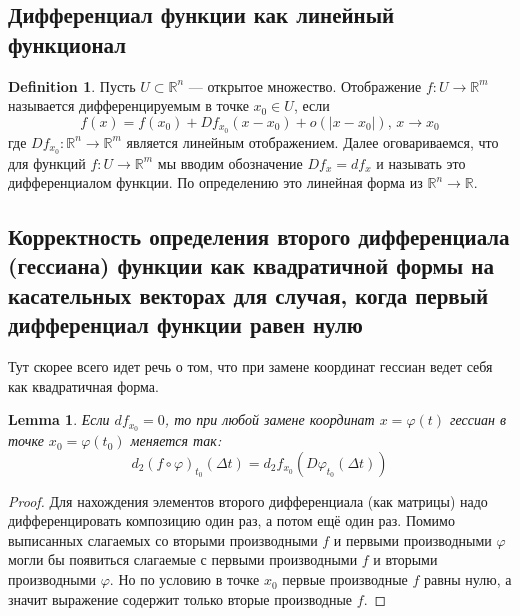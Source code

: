 \documentclass[a4paper,12pt]{article} %
\newtheorem{lemma}[theorem]{Lemma}
\theoremstyle{definition}
\newtheorem{definition}{Definition}[section]
\begin{document}
\subsection{Дифференциал функции как линейный функционал}
\begin{definition}
	Пусть $U \subset \mathbb{R}^n$ --- открытое множество. Отображение $f : U \rightarrow \mathbb{R}^m$ называется дифференцируемым в точке $x_0 \in U$, если
	\begin{equation}
		f(x) = f(x_0) + D f_{x_0} (x - x_0) + o(|x - x_0|), \, x \rightarrow x_0
	\end{equation}
	где $D f_{x_0} :  \mathbb{R}^n \rightarrow \mathbb{R}^m$ является линейным отображением. Далее оговариваемся, что для функций $f : U \rightarrow \mathbb{R}^m$  мы вводим обозначение $Df_x = df_x$ и называть это дифференциалом функции. По определению это линейная форма из $\mathbb{R}^n \rightarrow \mathbb{R}$.
\end{definition}
\subsection{Корректность определения второго дифференциала (гессиана) функции как квадратичной формы на касательных векторах для случая, когда первый дифференциал функции равен нулю}
Тут скорее всего идет речь о том, что при замене координат гессиан ведет себя как квадратичная форма. 
\begin{lemma}
	Если $df_{x_0} = 0$, то при любой замене координат $x = \varphi(t)$ гессиан в точке $x_0 = \varphi(t_0)$ меняется так:
	\begin{equation}
		d_2(f \circ \varphi)_{t_0}(\Delta t) = d_2 f_{x_0} (D \varphi_{t_0}(\Delta t))
	\end{equation}
\end{lemma}
\begin{proof}
	Для нахождения элементов второго дифференциала (как матрицы) надо дифференцировать композицию один раз, а потом ещё один раз. Помимо выписанных слагаемых со вторыми производными $f$ и первыми производными $\varphi$ могли бы появиться слагаемые с первыми производными $f$ и вторыми производными $\varphi$. Но по условию в точке $x_0$ первые производные $f$ равны нулю, а значит выражение содержит только вторые производные $f$.
\end{proof}
\end{document}
